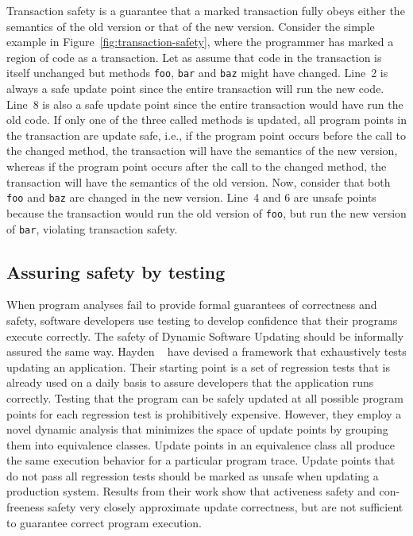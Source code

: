 

Transaction safety is a guarantee that a marked transaction fully obeys
either the semantics of the old version or that of the new version.
Consider the simple example in Figure~\ref{fig:transaction-safety}, where
the programmer has marked a region of code as a transaction. Let as assume
that code in the transaction is itself unchanged but methods {\tt foo},
{\tt bar} and {\tt baz} might have changed. Line~2 is always a safe update
point since the entire transaction will run the new code. Line~8 is also a
safe update point since the entire transaction would have run the old code.
If only one of the three called methods is updated, all program points in
the transaction are update safe, i.e., if the program point occurs before
the call to the changed method, the transaction will have the semantics of
the new version, whereas if the program point occurs after the call to the
changed method, the transaction will have the semantics of the old version.
Now, consider that both {\tt foo} and {\tt baz} are changed in the new
version. Line~4 and 6 are unsafe points because the transaction would run
the old version of {\tt foo}, but run the new version of {\tt bar},
violating transaction safety.

\subsection{Assuring safety by testing}
When program analyses fail to provide formal guarantees of correctness and
safety, software developers use testing to develop confidence that their
programs execute correctly.  The safety of Dynamic Software Updating should
be informally assured the same way. Hayden \EA~\cite{dsu-testing} have
devised a framework that exhaustively tests updating an application.  Their
starting point is a set of regression tests that is already used on a daily
basis to assure developers that the application runs correctly.  Testing
that the program can be safely updated at all possible program points for
each regression test is prohibitively expensive. However, they employ a novel dynamic
analysis that minimizes the space of update points by grouping them into
equivalence classes. Update points in an equivalence class all produce the
same execution behavior for a particular program trace.  Update points
that do not pass all regression tests should be marked as unsafe when
updating a production system. Results from their work show that activeness
safety and con-freeness safety very closely approximate update correctness,
but are not sufficient to guarantee correct program execution.
